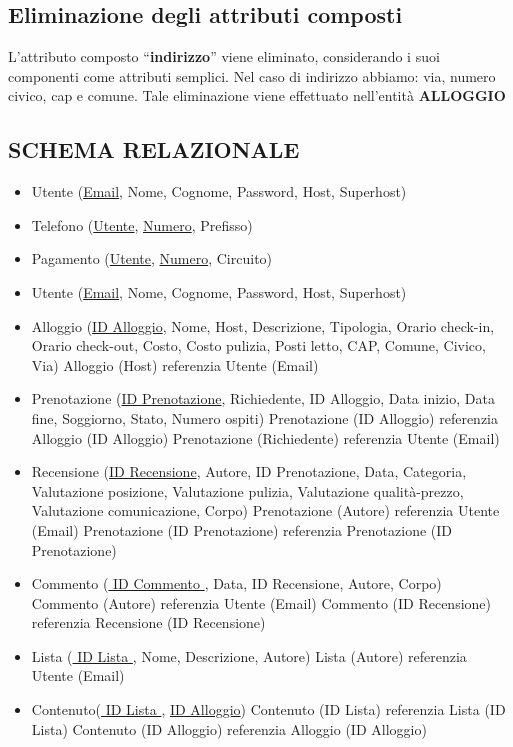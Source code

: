 \subsection{Eliminazione degli attributi composti}
L’attributo composto “\textbf{indirizzo}” viene eliminato, considerando i suoi componenti come attributi semplici. Nel caso di indirizzo abbiamo: via, numero civico, cap e comune.
Tale eliminazione viene effettuato nell'entità \textbf{ALLOGGIO}


\subsection{SCHEMA RELAZIONALE}
\begin{itemize}
  \item Utente (\underline{Email}, Nome, Cognome, Password, Host, Superhost)
  \item Telefono (\underline{Utente}, \underline{Numero}, Prefisso)
  \item Pagamento (\underline{Utente}, \underline{Numero}, Circuito)
  \item Utente (\underline{Email}, Nome, Cognome, Password, Host, Superhost)
  \item Alloggio (\underline{ID Alloggio}, Nome, Host, Descrizione, Tipologia, Orario check-in, Orario check-out, Costo, Costo pulizia, Posti letto, CAP, Comune, Civico, Via)
        Alloggio (Host) referenzia Utente (Email)
  \item Prenotazione (\underline{ID Prenotazione}, Richiedente, ID Alloggio, Data inizio, Data fine, Soggiorno, Stato, Numero ospiti)
        Prenotazione (ID Alloggio) referenzia Alloggio (ID Alloggio)
        Prenotazione (Richiedente) referenzia Utente (Email)
  \item Recensione (\underline{ID Recensione}, Autore, ID Prenotazione, Data, Categoria, Valutazione posizione, Valutazione pulizia, Valutazione qualità-prezzo, Valutazione comunicazione, Corpo)
        Prenotazione (Autore) referenzia Utente (Email)
        Prenotazione (ID Prenotazione) referenzia Prenotazione (ID Prenotazione)
  \item Commento (\underline{ ID Commento }, Data, ID Recensione, Autore, Corpo)
        Commento (Autore) referenzia Utente (Email)
        Commento (ID Recensione) referenzia Recensione (ID Recensione)
  \item Lista (\underline{ ID Lista }, Nome, Descrizione, Autore)
        Lista (Autore) referenzia Utente (Email)
  \item Contenuto(\underline{ ID Lista }, \underline{ID Alloggio})
        Contenuto (ID Lista) referenzia Lista (ID Lista)
        Contenuto (ID Alloggio) referenzia Alloggio (ID Alloggio)
\end{itemize}